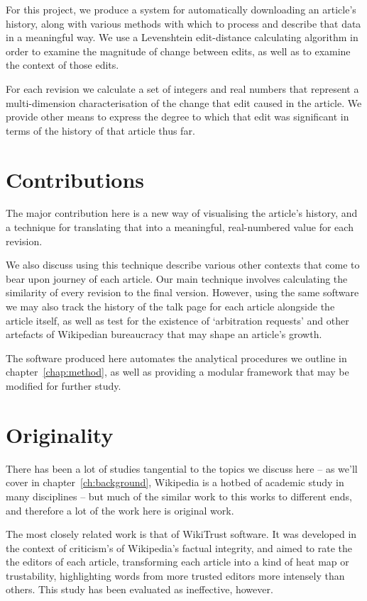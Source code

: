 For this project, we produce a system for automatically downloading an
article's history, along with various methods with which to process
and describe that data in a meaningful way. We use a Levenshtein
edit-distance calculating algorithm in order to examine the magnitude
of change between edits, as well as to examine the context of those
edits.

For each revision we calculate a set of integers and real numbers that
represent a multi-dimension characterisation of the change that edit
caused in the article. We provide other means to express the degree to
which that edit was significant in terms of the history of that
article thus far.

\section{Contributions}

The major contribution here is a new way of visualising the article's
history, and a technique for translating that into a meaningful,
real-numbered value for each revision.

We also discuss using this technique describe various other contexts
that come to bear upon journey of each article. Our main technique
involves calculating the similarity of every revision to the final
version. However, using the same software we may also track the
history of the talk page for each article alongside the article
itself, as well as test for the existence of `arbitration requests'
and other artefacts of Wikipedian bureaucracy that may shape an
article's growth.

The software produced here automates the analytical procedures we
outline in chapter~\ref{chap:method}, as well as providing a modular
framework that may be modified for further study.

\section{Originality}
There has been a lot of studies tangential to the topics we discuss
here -- as we'll cover in chapter~\ref{ch:background}, Wikipedia is a
hotbed of academic study in many disciplines -- but much of the
similar work to this works to different ends, and therefore a lot of
the work here is original work.

The most closely related work is that of WikiTrust software. It was
developed in the context of criticism's of Wikipedia's factual
integrity, and aimed to rate the the editors of each article,
transforming each article into a kind of heat map or trustability,
highlighting words from more trusted editors more intensely than
others.\cite{adler2012wikitrust} This study has been evaluated as
ineffective, however.\cite{Lucassen2011}

